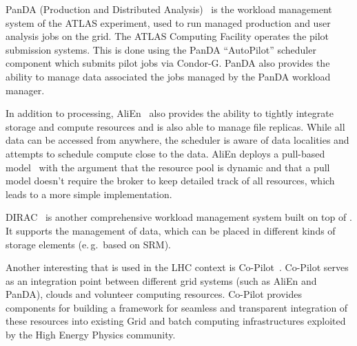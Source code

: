 \documentclass{sig-alternate}
\begin{document}
PanDA (Production and Distributed Analysis)~\cite{1742-6596-331-7-072069} is
the workload management system of the ATLAS experiment, used to run managed
production and user analysis jobs on the grid.
The ATLAS Computing Facility operates the pilot submission systems.
This is done using the PanDA “AutoPilot” scheduler component which submits
pilot jobs via Condor-G.
PanDA also provides the ability to manage data associated the jobs managed by
the PanDA workload manager.

In addition to processing, AliEn~\cite{1742-6596-119-6-062012} also provides
the ability to tightly integrate storage and compute resources and is also able
to manage file replicas.
While all data can be accessed from anywhere, the scheduler is aware
of data localities and attempts to schedule compute close to the data.
AliEn deploys a pull-based model~\cite{Saiz:2003:alien} with the argument
that the resource pool is dynamic and that a pull model doesn't require the
broker to keep detailed track of all resources, which leads to a more simple
implementation.

DIRAC~\cite{1742-6596-219-6-062049} is another comprehensive workload
management system built on top of \pilots.
It supports the management of data, which can be placed in different kinds of
storage elements (e.\,g.\ based on SRM).

Another interesting \pilot that is used in the LHC context is
Co-Pilot~\cite{copilot-tr}.
Co-Pilot serves as an integration point between different grid \pilotjob systems
(such as AliEn and PanDA), clouds and volunteer computing resources.
Co-Pilot provides components for building a framework for seamless and
transparent integration of these resources into existing Grid and batch
computing infrastructures exploited by the High Energy Physics community.

\end{document}
